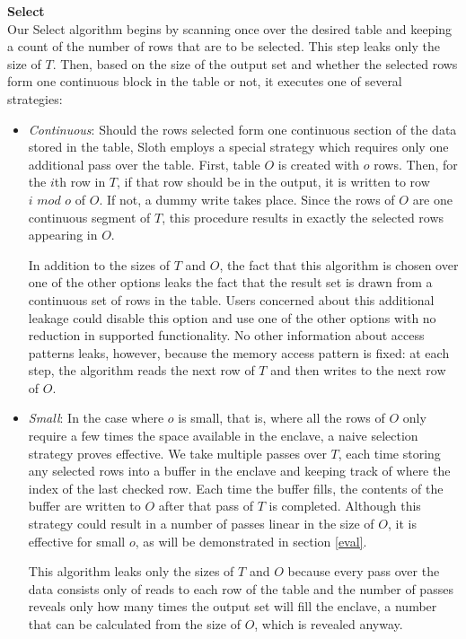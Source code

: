 \documentclass[USenglish,oneside,twocolumn]{article}
\def\name/{Sloth}
\begin{document}
\medskip \noindent \textbf{Select}\\
Our Select algorithm begins by scanning once over the desired table and keeping a count of the number of rows that are to be selected. This step leaks only the size of $T$. Then, based on the size of the output set and whether the selected rows form one continuous block in the table or not, it executes one of several strategies:
\begin{itemize}
\item \textit{Continuous}: Should the rows selected form one continuous section of the data stored in the table, \name/ employs a special strategy which requires only one additional pass over the table. First, table $O$ is created with $o$ rows. Then, for the $i$th row in $T$, if that row should be in the output, it is written to row $i\textit{ mod }o$ of $O$. If not, a dummy write takes place. Since the rows of $O$ are one continuous segment of $T$, this procedure results in exactly the selected rows appearing in $O$. 

In addition to the sizes of $T$ and $O$, the fact that this algorithm is chosen over one of the other options leaks the fact that the result set is drawn from a continuous set of rows in the table. Users concerned about this additional leakage could disable this option and use one of the other options with no reduction in supported functionality. No other information about access patterns leaks, however, because the memory access pattern is fixed: at each step, the algorithm reads the next row of $T$ and then writes to the next row of $O$. 

\item \textit{Small}: In the case where $o$ is small, that is, where all the rows of $O$ only require a few times the space available in the enclave, a naive selection strategy proves effective. We take multiple passes over $T$, each time storing any selected rows into a buffer in the enclave and keeping track of where the index of the last checked row. Each time the buffer fills, the contents of the buffer are written to $O$ after that pass of $T$ is completed. Although this strategy could result in a number of passes linear in the size of $O$, it is effective for small $o$, as will be demonstrated in section \ref{eval}.

This algorithm leaks only the sizes of $T$ and $O$ because every pass over the data consists only of reads to each row of the table and the number of passes reveals only how many times the output set will fill the enclave, a number that can be calculated from the size of $O$, which is revealed anyway. 


\end{itemize}
\end{document}
